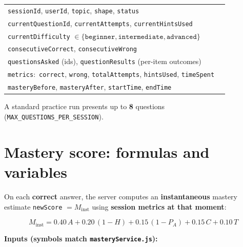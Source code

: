 \documentclass[12pt,a4paper]{article}
\begin{document}
\renewcommand{\arraystretch}{1.35}
\begin{tabularx}{\linewidth}{@{}l X@{}}
\toprule
\texttt{sessionId}, \texttt{userId}, \texttt{topic}, \texttt{shape}, \texttt{status} \\
\texttt{currentQuestionId}, \texttt{currentAttempts}, \texttt{currentHintsUsed} \\
\texttt{currentDifficulty} $\in \{\texttt{beginner},\texttt{intermediate},\texttt{advanced}\}$ \\
\texttt{consecutiveCorrect}, \texttt{consecutiveWrong} \\
\texttt{questionsAsked} (ids), \texttt{questionResults} (per-item outcomes) \\
\texttt{metrics}:\ \texttt{correct}, \texttt{wrong}, \texttt{totalAttempts}, \texttt{hintsUsed}, \texttt{timeSpent} \\
\texttt{masteryBefore}, \texttt{masteryAfter}, \texttt{startTime}, \texttt{endTime} \\
\bottomrule
\end{tabularx}

A standard practice run presents up to \textbf{8} questions (\texttt{MAX\_QUESTIONS\_PER\_SESSION}).

\section{Mastery score: formulas and variables}

\label{sec:mastery}
On each \textbf{correct} answer, the server computes an \textbf{instantaneous} mastery estimate
\texttt{newScore} $= M_{\mathrm{inst}}$ using \textbf{session metrics at that moment}:

\begin{mathbox}
\begin{equation}
\boxed{
M_{\mathrm{inst}} = 0.40\,A + 0.20\,(1-H) + 0.15\,(1-P_A) + 0.15\,C + 0.10\,T
}
\label{eq:mastery}
\end{equation}
\end{mathbox}

\noindent\textbf{Inputs (symbols match \texttt{masteryService.js}):}
\end{document}
